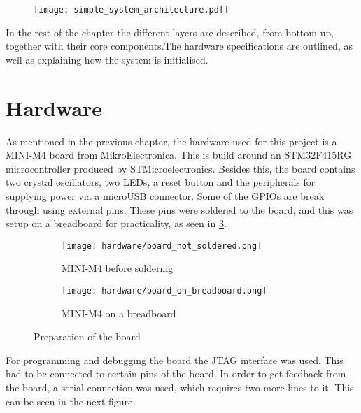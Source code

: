  
\begin{figure}[H]
\centering
\texttt{[image: simple\_system\_architecture.pdf]}
\end{figure}

In the rest of the chapter the different layers are described,
from bottom up, 
together with their core components.The hardware specifications
are outlined, as well as explaining how the system is initialised.

\section{Hardware}
As mentioned in the previous chapter, the hardware used for this project 
is a MINI-M4 board from MikroElectronica. This is build around an
STM32F415RG microcontroller produced by STMicroelectronics. Besides
this, the board contains two crystal oscillators, two LEDs, a reset 
button and the peripherals for supplying power via a microUSB connector.
Some of the GPIOs are break through using external pins.
These pins were soldered to the board, and this was setup on a breadboard
for practicality, as seen in \ref{fig:photo1}.

\begin{figure}[H]
\begin{subfigure}{0.5\textwidth}
  \centering
  \texttt{[image: hardware/board\_not\_soldered.png]}
  \caption{MINI-M4 before soldernig}
  \label{fig:sub1}
\end{subfigure}%
\begin{subfigure}{0.5\textwidth}
  \centering
  \texttt{[image: hardware/board\_on\_breadboard.png]}
  \caption{MINI-M4 on a breadboard}
  \label{fig:sub2}
\end{subfigure}
\caption{Preparation of the board}
\label{fig:photo1}
\end{figure}

For programming and debugging the board the JTAG interface was used.
This had to be connected to certain pins of the board. In order to get 
feedback from the board, a serial connection was used, which requires two
more lines to it. This can be seen in the next figure.

